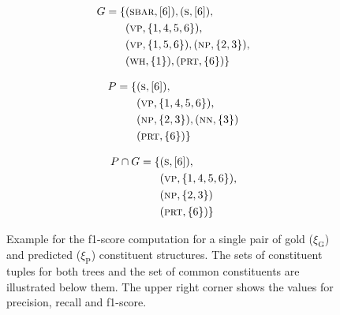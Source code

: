 \documentclass[../document.tex]{subfiles}
\begin{document}
\begin{figure}
        \begin{minipage}{.3\linewidth}
            \small
            \begin{align*}
                G = \{
                    &(\textsc{sbar}, [6]),
                     (\textsc{s}, [6]), \\
                    &(\textsc{vp}, \{1,4,5,6\}),\\
                    &(\textsc{vp}, \{1,5,6\}),
                     (\textsc{np}, \{2,3\}), \\
                    &(\textsc{wh}, \{1\}),
                     (\textsc{prt}, \{6\}) \}
             \end{align*}
         \end{minipage}
        \hfill
         \begin{minipage}{.3\linewidth}
             \small
             \begin{align*}
                P = \{
                    &(\textsc{s}, [6]), \\
                    &(\textsc{vp}, \{1,4,5,6\}),\\
                    &(\textsc{np}, \{2,3\}),
                     (\textsc{nn}, \{3\}) \\
                    &(\textsc{prt}, \{6\}) \}
            \end{align*}
        \end{minipage}
        \hfill
        \begin{minipage}{.3\linewidth}
            \small
            \begin{align*}
                P \cap G = \{
                &(\textsc{s}, [6]), \\
                &(\textsc{vp}, \{1,4,5,6\}),\\
                &(\textsc{np}, \{2,3\}) \\
                &(\textsc{prt}, \{6\}) \}
            \end{align*}
        \end{minipage}

        \caption{
            Example for the f1-score computation for a single pair of gold (\(\xi_\text{G}\)) and predicted (\(\xi_\text{P}\)) constituent structures.
            The sets of constituent tuples for both trees and the set of common constituents are illustrated below them.
            The upper right corner shows the values for precision, recall and f1-score.
        }
    \end{figure}
\end{document}
